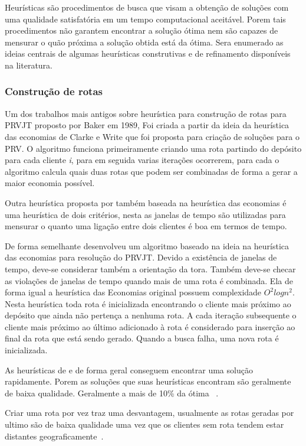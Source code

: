 Heurísticas são procedimentos de busca que visam a obtenção de soluções com uma qualidade satisfatória em um tempo computacional aceitável. Porem tais procedimentos não garantem encontrar a solução ótima nem são capazes de mensurar o quão próxima a solução obtida está da ótima. Sera enumerado as ideias centrais de algumas heurísticas construtivas e de refinamento disponíveis na literatura.

\subsubsection{Construção de rotas}

Um dos trabalhos mais antigos sobre heurística para construção de rotas para PRVJT proposto por Baker \cite{Baker} em 1989, Foi criada a partir da ideia da heurística das economias de Clarke e Write \cite{Clarke} que foi proposta para criação de soluções para o PRV. O algoritmo funciona primeiramente criando uma rota partindo do depósito para cada cliente \textit{i}, para em seguida varias iterações ocorrerem, para cada o algoritmo calcula quais duas rotas que podem ser combinadas de forma a gerar a maior economia possível.

Outra heurística proposta por \cite{VANLANDEGHEM} também baseada na heurística das economias é uma heurística de dois critérios, nesta as janelas de tempo são utilizadas para mensurar o quanto uma ligação entre dois clientes é boa em termos de tempo.

De forma semelhante \cite{Solomon} desenvolveu um algoritmo baseado na ideia na heurística das economias para resolução do PRVJT. Devido a existência de janelas de tempo, deve-se considerar também a orientação da tora. Também deve-se checar as violações de janelas de tempo quando mais de uma rota é combinada. Ela de forma igual a heurística das Economias original possuem complexidade \(O^2 log n^2\).
Nesta heurística toda rota é inicializada encontrando o cliente mais próximo ao depósito que ainda não pertença a nenhuma rota. A cada iteração subsequente o cliente mais próximo ao último adicionado à rota é considerado para inserção ao final da rota que está sendo gerado. Quando a busca falha, uma nova rota é inicializada.

As heurísticas de \cite{VANLANDEGHEM} e \cite{Solomon} de forma geral conseguem encontrar uma solução rapidamente. Porem as soluções que suas heurísticas encontram são geralmente de baixa qualidade. Geralmente a mais de 10\% da ótima ~\cite{Sherbeny}.

Criar uma rota por vez  traz uma desvantagem, usualmente as rotas geradas por ultimo são de baixa qualidade uma vez que os clientes sem rota tendem estar distantes geograficamente~\cite{Sherbeny}. 

